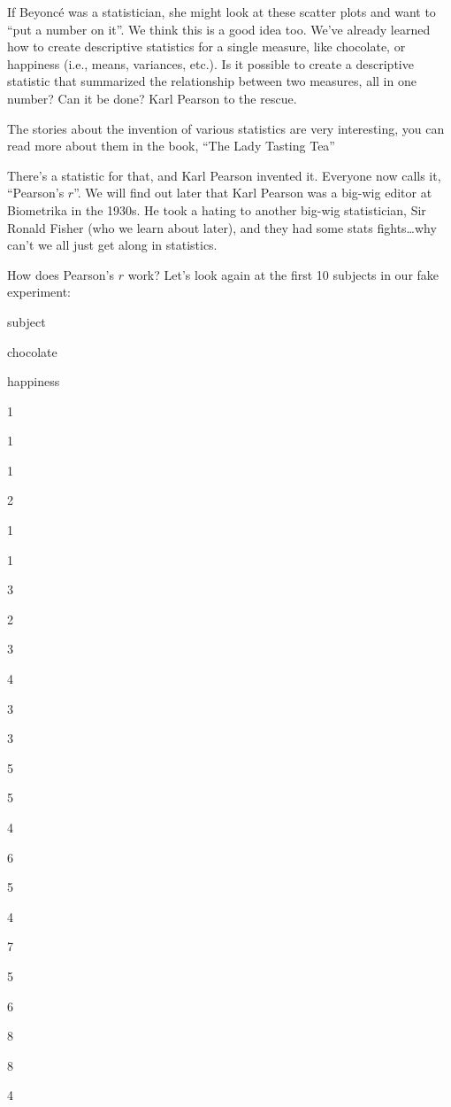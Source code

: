\documentclass[
]{book}
\begin{document}
If Beyoncé was a statistician, she might look at these scatter plots and want to ``put a number on it''. We think this is a good idea too. We've already learned how to create descriptive statistics for a single measure, like chocolate, or happiness (i.e., means, variances, etc.). Is it possible to create a descriptive statistic that summarized the relationship between two measures, all in one number? Can it be done? Karl Pearson to the rescue.

\begin{marginnote}

The stories about the invention of various statistics are very interesting, you can read more about them in the book, ``The Lady Tasting Tea'' \citep{salsburg2001lady}

\end{marginnote}

There's a statistic for that, and Karl Pearson invented it. Everyone now calls it, ``Pearson's \(r\)''. We will find out later that Karl Pearson was a big-wig editor at Biometrika in the 1930s. He took a hating to another big-wig statistician, Sir Ronald Fisher (who we learn about later), and they had some stats fights\ldots why can't we all just get along in statistics.

How does Pearson's \(r\) work? Let's look again at the first 10 subjects in our fake experiment:

subject

chocolate

happiness

1

1

1

2

1

1

3

2

3

4

3

3

5

5

4

6

5

4

7

5

6

8

8

4
\end{document}
